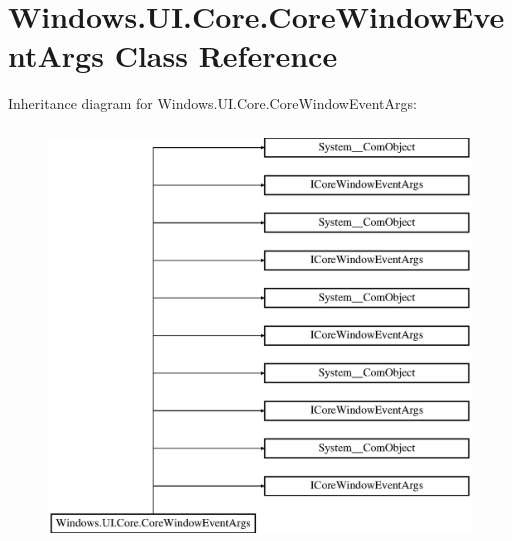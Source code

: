\hypertarget{class_windows_1_1_u_i_1_1_core_1_1_core_window_event_args}{}\section{Windows.\+U\+I.\+Core.\+Core\+Window\+Event\+Args Class Reference}
\label{class_windows_1_1_u_i_1_1_core_1_1_core_window_event_args}
Inheritance diagram for Windows.\+U\+I.\+Core.\+Core\+Window\+Event\+Args\+:\begin{figure}[H]
\begin{center}
\leavevmode
\includegraphics[height=11.000000cm]{class_windows_1_1_u_i_1_1_core_1_1_core_window_event_args}
\end{center}
\end{figure}
